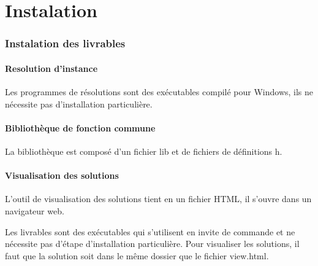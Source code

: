 \chapter{Instalation}

\subsection{Instalation des livrables}

\subsubsection{Resolution d'instance}
Les programmes de résolutions sont des exécutables compilé pour Windows,
ils ne nécessite pas d'installation particulière.

\subsubsection{Bibliothèque de fonction commune}
La bibliothèque est composé d'un fichier lib et de fichiers de définitions h.


\subsubsection{Visualisation des solutions}
L'outil de visualisation des solutions tient en un fichier HTML, il s'ouvre dans un navigateur web.

Les livrables sont des exécutables qui s'utilisent en invite de commande et ne nécessite pas d'étape d'installation particulière.
Pour visualiser les solutions, il faut que la solution soit dans le même dossier que le fichier view.html.

